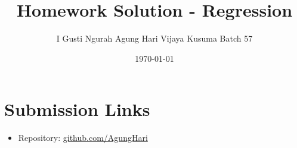 \documentclass[12pt]{article}
\title{Homework Solution - Regression}
\author{I Gusti Ngurah Agung Hari Vijaya Kusuma Batch 57}
\date{\today}
\begin{document}
\maketitle

\section*{Submission Links}
\begin{itemize}
  \item Repository: \href{https://github.com/AgungHari/Rakamin_HW_MachineLearning_SupervisedLearning}{github.com/AgungHari}
\end{itemize}






\end{document}
